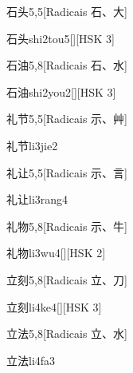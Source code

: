 \begin{entry}{石头}{5,5}[Radicais ⽯、⼤]
  \begin{phonetics}{石头}{shi2tou5}[][HSK 3]
  \end{phonetics}
\end{entry}

\begin{entry}{石油}{5,8}[Radicais ⽯、⽔]
  \begin{phonetics}{石油}{shi2you2}[][HSK 3]
  \end{phonetics}
\end{entry}

\begin{entry}{礼节}{5,5}[Radicais ⽰、⾋]
  \begin{phonetics}{礼节}{li3jie2}
  \end{phonetics}
\end{entry}

\begin{entry}{礼让}{5,5}[Radicais ⽰、⾔]
  \begin{phonetics}{礼让}{li3rang4}
  \end{phonetics}
\end{entry}

\begin{entry}{礼物}{5,8}[Radicais ⽰、⽜]
  \begin{phonetics}{礼物}{li3wu4}[][HSK 2]
  \end{phonetics}
\end{entry}

\begin{entry}{立刻}{5,8}[Radicais ⽴、⼑]
  \begin{phonetics}{立刻}{li4ke4}[][HSK 3]
  \end{phonetics}
\end{entry}

\begin{entry}{立法}{5,8}[Radicais ⽴、⽔]
  \begin{phonetics}{立法}{li4fa3}
  \end{phonetics}
\end{entry}

